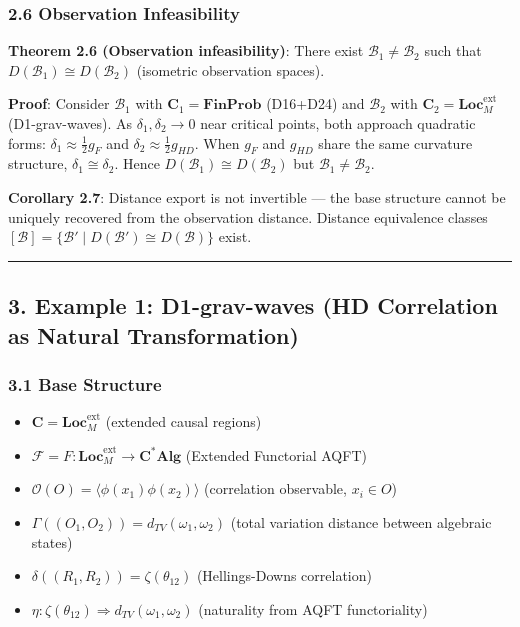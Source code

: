 \documentclass[
]{article}
\providecommand{\tightlist}{%
  \setlength{\itemsep}{0pt}\setlength{\parskip}{0pt}}
\begin{document}
\subsubsection{2.6 Observation
Infeasibility}\label{observation-infeasibility}

\textbf{Theorem 2.6 (Observation infeasibility)}: There exist
\(\mathcal{B}_1 \neq \mathcal{B}_2\) such that
\(D(\mathcal{B}_1) \cong D(\mathcal{B}_2)\) (isometric observation
spaces).

\textbf{Proof}: Consider \(\mathcal{B}_1\) with
\(\mathbf{C}_1 = \mathbf{FinProb}\) (D16+D24) and \(\mathcal{B}_2\) with
\(\mathbf{C}_2 = \mathbf{Loc}_M^{\text{ext}}\) (D1-grav-waves). As
\(\delta_1, \delta_2 \to 0\) near critical points, both approach
quadratic forms: \(\delta_1 \approx \frac{1}{2} g_F\) and
\(\delta_2 \approx \frac{1}{2} g_{HD}\). When \(g_F\) and \(g_{HD}\)
share the same curvature structure, \(\delta_1 \cong \delta_2\). Hence
\(D(\mathcal{B}_1) \cong D(\mathcal{B}_2)\) but
\(\mathcal{B}_1 \neq \mathcal{B}_2\).

\textbf{Corollary 2.7}: Distance export is not invertible --- the base
structure cannot be uniquely recovered from the observation distance.
Distance equivalence classes
\([\mathcal{B}] = \{\mathcal{B}' \mid D(\mathcal{B}') \cong D(\mathcal{B})\}\)
exist.

\begin{center}\rule{0.5\linewidth}{0.5pt}\end{center}

\subsection{3. Example 1: D1-grav-waves (HD Correlation as Natural
Transformation)}\label{example-1-d1-grav-waves-hd-correlation-as-natural-transformation}

\subsubsection{3.1 Base Structure}\label{base-structure}

\begin{itemize}
\tightlist
\item
  \(\mathbf{C} = \mathbf{Loc}_M^{\text{ext}}\) (extended causal regions)
\item
  \(\mathcal{F} = F: \mathbf{Loc}_M^{\text{ext}} \to \mathbf{C}^*\mathbf{Alg}\)
  (Extended Functorial AQFT)
\item
  \(\mathcal{O}(O) = \langle \phi(x_1)\phi(x_2) \rangle\) (correlation
  observable, \(x_i \in O\))
\item
  \(\Gamma((O_1, O_2)) = d_{TV}(\omega_1, \omega_2)\) (total variation
  distance between algebraic states)
\item
  \(\delta((R_1, R_2)) = \zeta(\theta_{12})\) (Hellings-Downs
  correlation)
\item
  \(\eta: \zeta(\theta_{12}) \Rightarrow d_{TV}(\omega_1, \omega_2)\)
  (naturality from AQFT functoriality)
\end{itemize}
\end{document}
